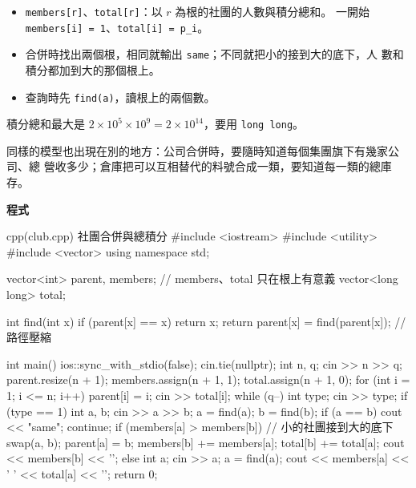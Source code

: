 \begin{itemize}
\item \texttt{members[r]}、\texttt{total[r]}：以 $r$ 為根的社團的人數與積分總和。
一開始 \texttt{members[i] = 1}、\texttt{total[i] = p\_i}。
\item 合併時找出兩個根，相同就輸出 \texttt{same}；不同就把小的接到大的底下，人
數和積分都加到大的那個根上。
\item 查詢時先 \texttt{find(a)}，讀根上的兩個數。
\end{itemize}

積分總和最大是 $2 \times 10^5 \times 10^9 = 2 \times 10^{14}$，要用
\texttt{long long}。

同樣的模型也出現在別的地方：公司合併時，要隨時知道每個集團旗下有幾家公司、總
營收多少；倉庫把可以互相替代的料號合成一類，要知道每一類的總庫存。

\textbf{程式}

\begin{example}[label=ex:club]{cpp}{(club.cpp) 社團合併與總積分}
#include <iostream>
#include <utility>
#include <vector>
using namespace std;

vector<int> parent, members;          // members、total 只在根上有意義
vector<long long> total;

int find(int x) {
    if (parent[x] == x) {
        return x;
    }
    return parent[x] = find(parent[x]);   // 路徑壓縮
}

int main() {
    ios::sync_with_stdio(false);
    cin.tie(nullptr);
    int n, q;
    cin >> n >> q;
    parent.resize(n + 1);
    members.assign(n + 1, 1);
    total.assign(n + 1, 0);
    for (int i = 1; i <= n; i++) {
        parent[i] = i;
        cin >> total[i];
    }
    while (q--) {
        int type;
        cin >> type;
        if (type == 1) {
            int a, b;
            cin >> a >> b;
            a = find(a);
            b = find(b);
            if (a == b) {
                cout << "same\n";
                continue;
            }
            if (members[a] > members[b]) {    // 小的社團接到大的底下
                swap(a, b);
            }
            parent[a] = b;
            members[b] += members[a];
            total[b] += total[a];
            cout << members[b] << '\n';
        } else {
            int a;
            cin >> a;
            a = find(a);
            cout << members[a] << ' ' << total[a] << '\n';
        }
    }
    return 0;
}
\end{example}


